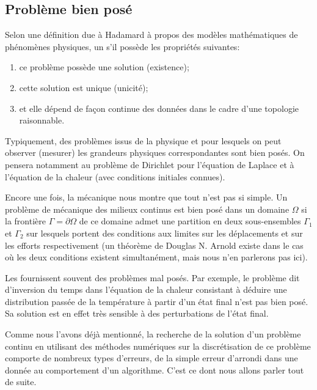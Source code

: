 \subsection{Problème bien posé}
Selon une définition due à Hadamard à propos des modèles mathématiques de phénomènes physiques, un  s'il possède les propriétés suivantes:
\begin{enumerate}
   \item ce problème possède une solution (existence);
   \item cette solution est unique (unicité);
   \item et elle dépend de façon continue des données dans le cadre d'une topologie raisonnable.
\end{enumerate}
\medskipvm
Typiquement, des problèmes issus de la physique et pour lesquels on peut observer (mesurer) les grandeurs physiques correspondantes sont bien posés. On pensera notamment au problème de Dirichlet pour l'équation de Laplace et à l'équation de la chaleur (avec conditions
initiales connues).

\medskip
Encore une fois, la mécanique nous montre que tout n'est pas si simple. Un problème de mécanique des milieux continus est bien posé dans un domaine $\Omega$ si la frontière $\Gamma=\partial\Omega$ de ce domaine admet une partition en deux sous-ensembles $\Gamma_1$ et $\Gamma_2$ sur lesquels portent des conditions aux limites sur les déplacements et sur les efforts respectivement (un théorème de Douglas N. Arnold existe dans le cas où les deux conditions existent simultanément, mais nous n'en parlerons pas ici).


\medskip
Les  fournissent souvent des problèmes mal posés.
Par exemple, le problème dit d'inversion du temps dans l'équation de la chaleur consistant à déduire une distribution passée de la température à partir d'un état final n'est pas bien posé. Sa solution est en effet très sensible à des perturbations de l'état final.

\medskip
Comme nous l'avons déjà mentionné, la recherche de la solution d'un problème continu en utilisant des méthodes numériques sur la discrétisation de ce problème comporte de nombreux types d'erreurs, de la simple erreur d'arrondi dans une donnée au comportement
d'un algorithme. C'est ce dont nous allons parler tout de suite.


